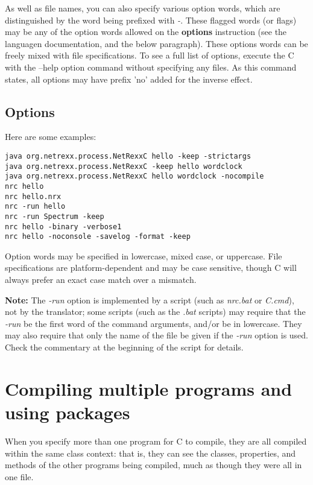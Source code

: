 As well as file names, you can also specify various option words, which
are distinguished by the word being prefixed with \emph{-}.  These
flagged words (or flags) may be any of the option words allowed
on the \nr{} \textbf{options} instruction (see the \nr{} languagen
documentation, and the below paragraph).  These options words can be freely mixed with file
specifications.  To see a full list of options, execute the \nr{}C with the --help option
command without specifying any files. As this command states, all options may have prefix 'no' added for the inverse effect.

\subsection{Options}

Here are some examples:
\begin{verbatim}
java org.netrexx.process.NetRexxC hello -keep -strictargs
java org.netrexx.process.NetRexxC -keep hello wordclock
java org.netrexx.process.NetRexxC hello wordclock -nocompile
nrc hello
nrc hello.nrx
nrc -run hello
nrc -run Spectrum -keep
nrc hello -binary -verbose1
nrc hello -noconsole -savelog -format -keep
\end{verbatim}

Option words may be specified in lowercase, mixed case, or uppercase.
File specifications are platform-dependent and may be case sensitive,
though \nr{}C will always prefer an exact case match over a mismatch.

\textbf{Note:} The \emph{-run} option is implemented by a script (such
as \emph{nrc.bat} or \emph{\nr{}C.cmd}), not by the translator; some
scripts (such as the \emph{.bat} scripts) may require that
the \emph{-run} be the first word of the command arguments, and/or be in
lowercase.  They may also require that only the name of the file be
given if the \emph{-run} option is used.  Check the commentary at the
beginning of the script for details.

\section{Compiling multiple programs and using packages}

When you specify more than one program for \nr{}C to compile, they are
all compiled within the same class context: that is, they can see
the classes, properties, and methods of the other programs being
compiled, much as though they were all in one file.

